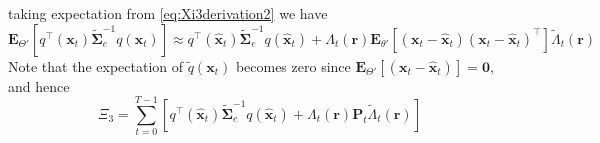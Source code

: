 \documentclass[]{article}
\begin{document}
taking expectation from \ref{eq:Xi3derivation2} we have 
\begin{equation}\label{eq:Xi3derivation3}
\mathbf E_{\Theta'}\left[ q^\top(\mathbf x_t)\tilde{\boldsymbol\Sigma}_e^{-1}q(\mathbf x_t)\right]\approx q^\top(\mathbf {\hat x}_t)\tilde{\boldsymbol\Sigma}_e^{-1}q(\mathbf {\hat x}_t)  +\Lambda_t(\mathbf r)\mathbf E_{\theta'}\left[  (\mathbf x_t - \mathbf  {\hat x}_t) (\mathbf x_t - \mathbf  {\hat x}_t)^\top\right]\tilde{\Lambda}_t(\mathbf r)
\end{equation}
Note that the expectation of $\tilde{q}(\mathbf x_t)$ becomes zero since $\mathbf E_{\Theta'}\left[(\mathbf x_t - \mathbf  {\hat x}_t)\right]= \mathbf 0$, and hence
\begin{equation}
 \Xi_3= \sum_{t=0}^{T-1}\left[q^\top(\mathbf{\hat x}_t)\tilde{\boldsymbol\Sigma}_e^{-1}q(\mathbf{\hat x}_t)+\Lambda_t(\mathbf r)\mathbf P_t \tilde{\Lambda}_t(\mathbf r)\right]
\end{equation}
\end{document}
